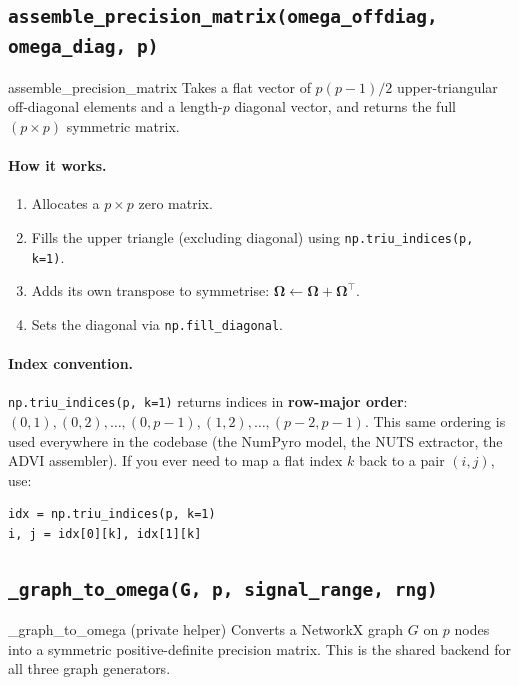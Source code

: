 \documentclass[11pt,a4paper]{article}
\newcommand{\bOmega}{\bm{\Omega}}
\begin{document}
\subsection{\texttt{assemble\_precision\_matrix(omega\_offdiag, omega\_diag, p)}}

\begin{funccard}{assemble\_precision\_matrix}
Takes a flat vector of $p(p-1)/2$ upper-triangular off-diagonal elements and a length-$p$ diagonal vector, and returns the full $(p \times p)$ symmetric matrix.
\end{funccard}

\paragraph{How it works.}
\begin{enumerate}[nosep]
  \item Allocates a $p \times p$ zero matrix.
  \item Fills the upper triangle (excluding diagonal) using \texttt{np.triu\_indices(p, k=1)}.
  \item Adds its own transpose to symmetrise: $\bOmega \leftarrow \bOmega + \bOmega^\top$.
  \item Sets the diagonal via \texttt{np.fill\_diagonal}.
\end{enumerate}

\paragraph{Index convention.} \texttt{np.triu\_indices(p, k=1)} returns indices in \textbf{row-major order}: $(0,1), (0,2), \ldots, (0,p{-}1), (1,2), \ldots, (p{-}2,p{-}1)$. This same ordering is used everywhere in the codebase (the NumPyro model, the NUTS extractor, the ADVI assembler). If you ever need to map a flat index $k$ back to a pair $(i,j)$, use:
\begin{lstlisting}
idx = np.triu_indices(p, k=1)
i, j = idx[0][k], idx[1][k]
\end{lstlisting}

\subsection{\texttt{\_graph\_to\_omega(G, p, signal\_range, rng)}}

\begin{funccard}{\_graph\_to\_omega \textnormal{(private helper)}}
Converts a NetworkX graph $G$ on $p$ nodes into a symmetric positive-definite precision matrix. This is the shared backend for all three graph generators.
\end{funccard}
\end{document}
